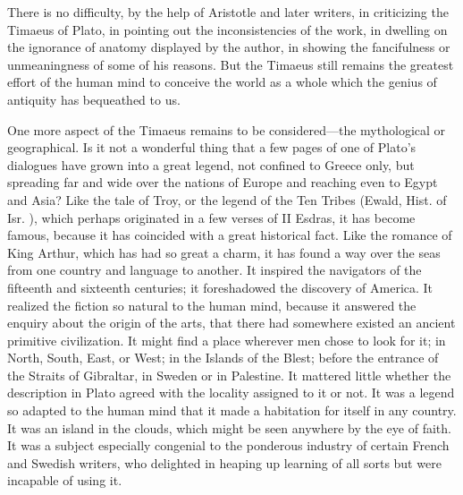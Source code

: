 \documentclass[11pt,letter]{article}
\begin{document}
\par  There is no difficulty, by the help of Aristotle and later writers, in criticizing the Timaeus of Plato, in pointing out the inconsistencies of the work, in dwelling on the ignorance of anatomy displayed by the author, in showing the fancifulness or unmeaningness of some of his reasons. But the Timaeus still remains the greatest effort of the human mind to conceive the world as a whole which the genius of antiquity has bequeathed to us.

\par  One more aspect of the Timaeus remains to be considered—the mythological or geographical. Is it not a wonderful thing that a few pages of one of Plato’s dialogues have grown into a great legend, not confined to Greece only, but spreading far and wide over the nations of Europe and reaching even to Egypt and Asia? Like the tale of Troy, or the legend of the Ten Tribes (Ewald, Hist. of Isr. ), which perhaps originated in a few verses of II Esdras, it has become famous, because it has coincided with a great historical fact. Like the romance of King Arthur, which has had so great a charm, it has found a way over the seas from one country and language to another. It inspired the navigators of the fifteenth and sixteenth centuries; it foreshadowed the discovery of America. It realized the fiction so natural to the human mind, because it answered the enquiry about the origin of the arts, that there had somewhere existed an ancient primitive civilization. It might find a place wherever men chose to look for it; in North, South, East, or West; in the Islands of the Blest; before the entrance of the Straits of Gibraltar, in Sweden or in Palestine. It mattered little whether the description in Plato agreed with the locality assigned to it or not. It was a legend so adapted to the human mind that it made a habitation for itself in any country. It was an island in the clouds, which might be seen anywhere by the eye of faith. It was a subject especially congenial to the ponderous industry of certain French and Swedish writers, who delighted in heaping up learning of all sorts but were incapable of using it.
\end{document}
